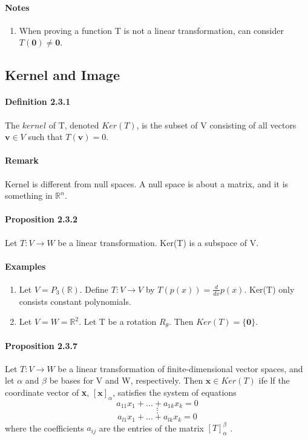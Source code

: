 \documentclass[11pt]{article}
\newcommand{\tb}[1]{\textbf{#1}}
\newcommand{\mb}[1]{\mathbb{#1}}
\newcommand{\litran}[0]{$T: V \rightarrow W$ }
\newcommand{\slitran}[0]{Let $ T: V \rightarrow W$ be a linear transformation }
\newcommand{\mt}[0]{$[T]_\alpha^\beta$ }
\newcommand{\real}[0]{\mathbb{R}}
\begin{document}
{ \paragraph{Notes}
 \begin{enumerate}
 	\item When proving a function T is not a linear transformation, can consider $T(\tb{0}) \neq \tb{0}$.
 \end{enumerate}
 \subsection{Kernel and Image}
 \paragraph{Definition 2.3.1} The $kernel$ of T, denoted $Ker(T)$, is the subset of V consisting of all vectors $\tb{v} \in V$ such that $T(\tb{v}) = 0$.
 \paragraph{Remark} Kernel is different from null spaces. A null space is about a matrix, and it is something in $\real ^n$.
 \paragraph{Proposition 2.3.2} Let \litran be a linear transformation. Ker(T) is a subspace of V.
 \paragraph{Examples}
 \begin{enumerate}
 	\item Let $V = P_3(\mb{R})$. Define $T: V \rightarrow V$ by $T(p(x)) = \frac{d}{dx}p(x)$. Ker(T) only consists constant polynomials.
 	\item Let $V = W = \mb{R}^2$. Let T be a rotation $R_\theta$. Then $Ker(T) = \{\tb{0}\}$.
 \end{enumerate}
 \paragraph{Proposition 2.3.7} \slitran of finite-dimensional vector spaces, and let $\alpha$ and $\beta$ be bases for V and W, respectively. Then $\tb{x} \in Ker(T)$ ife lf the coordinate vector of \tb{x}, $[\tb{x}]_\alpha$, satisfies the system of equations
 $$ a_{11}x_1+...+a_{1k}x_k = 0$$
 $$\vdots$$
 $$ a_{l1}x_1+...+a_{lk}x_k = 0$$
 where the coefficients $a_{ij}$ are the entries of the matrix \mt.
}
\end{document}
